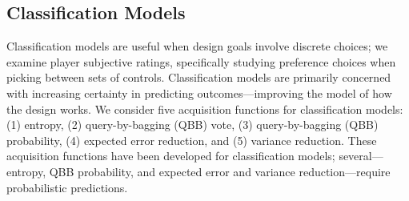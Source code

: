 \documentclass{sig-alternate}
\begin{document}
\subsection{Classification Models}
Classification models are useful when design goals involve discrete choices; we examine player subjective ratings, specifically studying preference choices when picking between sets of controls.
Classification models are primarily concerned with increasing certainty in predicting outcomes---improving the model of how the design works.
We consider five acquisition functions for classification models: (1) entropy, (2) query-by-bagging (QBB) vote, (3) query-by-bagging (QBB) probability, (4) expected error reduction, and (5) variance reduction.
These acquisition functions have been developed for classification models; several---entropy, QBB probability, and expected error and variance reduction---require probabilistic predictions.
\end{document}
